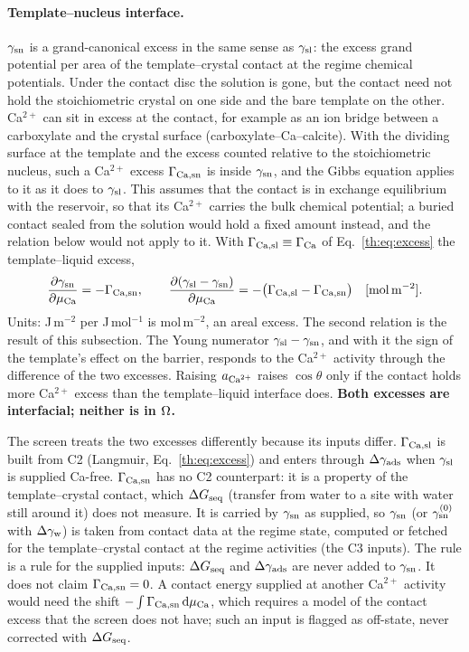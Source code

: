 \paragraph{Template--nucleus interface.} $\gamma_\mathrm{sn}$ is a grand-canonical excess in the same sense as
$\gamma_\mathrm{sl}$: the excess grand potential per area of the template--crystal contact at the regime
chemical potentials. Under the contact disc the solution is gone, but the contact need not hold
the stoichiometric crystal on one side and the bare template on the other. Ca$^{2+}$ can sit in
excess at the contact, for example as an ion bridge between a carboxylate and the crystal surface
(carboxylate--Ca--calcite). With the dividing surface at the template and the excess counted
relative to the stoichiometric nucleus, such a Ca$^{2+}$ excess $\Gamma_\mathrm{Ca,sn}$ is inside $\gamma_\mathrm{sn}$, and the
Gibbs equation applies to it as it does to $\gamma_\mathrm{sl}$. This assumes that the contact is in
exchange equilibrium with the reservoir, so that its Ca$^{2+}$ carries the bulk chemical potential;
a buried contact sealed from the solution would hold a fixed amount instead, and the relation below
would not apply to it. With $\Gamma_\mathrm{Ca,sl}\equiv\Gamma_\mathrm{Ca}$ of
Eq.~\eqref{th:eq:excess} the template--liquid excess,
\begin{equation}\label{th:eq:gibbs-sn}
\frac{\partial\gamma_\mathrm{sn}}{\partial\mu_\mathrm{Ca}}=-\Gamma_\mathrm{Ca,sn},\qquad
\frac{\partial(\gamma_\mathrm{sl}-\gamma_\mathrm{sn})}{\partial\mu_\mathrm{Ca}}=-\big(\Gamma_\mathrm{Ca,sl}-\Gamma_\mathrm{Ca,sn}\big) \quad[\mathrm{mol\,m^{-2}}].
\end{equation}
Units: J\,m$^{-2}$ per J\,mol$^{-1}$ is mol\,m$^{-2}$, an areal excess. The second relation is the
result of this subsection. The Young numerator $\gamma_\mathrm{sl}-\gamma_\mathrm{sn}$, and with it the sign of the template's
effect on the barrier, responds to the Ca$^{2+}$ activity through the difference of the two
excesses. Raising $a_{\mathrm{Ca}^{2+}}$ raises $\cos\theta$ only if the contact holds more Ca$^{2+}$ excess than
the template--liquid interface does. \textbf{Both excesses are interfacial; neither is in $\Omega$.}

The screen treats the two excesses differently because its inputs differ. $\Gamma_\mathrm{Ca,sl}$ is built from
C2 (Langmuir, Eq.~\eqref{th:eq:excess}) and enters through $\Delta\gamma_\mathrm{ads}$ when $\gamma_\mathrm{sl}$ is supplied
Ca-free. $\Gamma_\mathrm{Ca,sn}$ has no C2 counterpart: it is a property of the template--crystal contact, which
$\Delta G_\mathrm{seq}$ (transfer from water to a site with water still around it) does not measure. It is
carried by $\gamma_\mathrm{sn}$ as supplied, so $\gamma_\mathrm{sn}$ (or $\gamma_\mathrm{sn}^{(0)}$ with $\Delta\gamma_\mathrm{w}$) is taken from contact data at
the regime state, computed or fetched for the template--crystal contact at the regime activities
(the C3 inputs). The rule is a rule for the supplied inputs: $\Delta G_\mathrm{seq}$ and $\Delta\gamma_\mathrm{ads}$ are never added to
$\gamma_\mathrm{sn}$. It does not claim $\Gamma_\mathrm{Ca,sn}=0$. A contact energy supplied at another Ca$^{2+}$ activity would
need the shift $-\int\Gamma_\mathrm{Ca,sn}\,\mathrm{d}\mu_\mathrm{Ca}$, which requires a model of the contact excess that
the screen does not have; such an input is flagged as off-state, never corrected with $\Delta G_\mathrm{seq}$.

